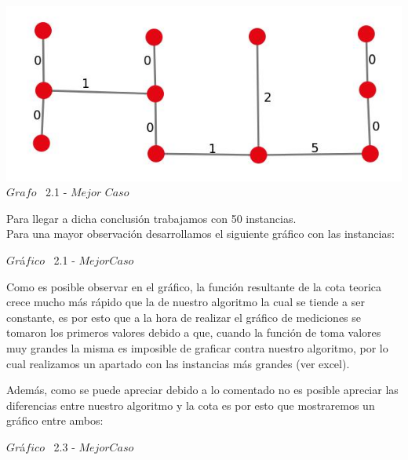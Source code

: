 \vspace*{0.3cm} \vspace*{0.3cm}
  \begin{center}
 \includegraphics[scale=0.5]{./EJ2/ej2grafocompleto.jpeg}
 \\{$Grafo$ \ 2.1 - $Mejor$ $Caso$}
  \end{center}
  \vspace*{0.3cm}
  
Para llegar a dicha conclusi\'on trabajamos con 50 instancias.\\

Para una mayor observaci\'on desarrollamos el siguiente gr\'afico con las instancias:\\

\vspace*{0.3cm} \vspace*{0.3cm}
  \begin{center}
 {$Gr$\'a$fico$ \ 2.1 - $Mejor Caso$}
  \end{center}
  \vspace*{0.3cm}
  
Como es posible observar en el gr\'afico, la funci\'on resultante de la cota teorica crece mucho m\'as r\'apido que la de nuestro algoritmo la cual se tiende a ser constante, es por esto que a la hora de realizar el gr\'afico de mediciones se tomaron los primeros valores debido a que, cuando la funci\'on de  toma valores muy grandes la misma es imposible de graficar contra nuestro algoritmo, por lo cual realizamos un apartado con las instancias m\'as grandes (ver excel).

Adem\'as, como se puede apreciar debido a lo comentado no es posible apreciar las diferencias entre nuestro algoritmo y la cota  es por esto que mostraremos un gr\'afico entre ambos:\\

\vspace*{0.3cm} \vspace*{0.3cm}
  \begin{center}
{$Gr$\'a$fico$ \ 2.3 - $Mejor Caso$}
  \end{center}
  \vspace*{0.3cm}


